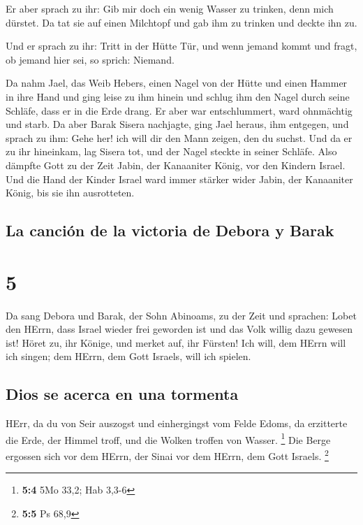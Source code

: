  Er aber sprach zu ihr: Gib mir doch ein wenig Wasser zu
trinken, denn mich dürstet. Da tat sie auf einen Milchtopf und gab ihm
zu trinken und deckte ihn zu.

 Und er sprach zu ihr: Tritt in der Hütte Tür, und wenn
jemand kommt und fragt, ob jemand hier sei, so sprich: Niemand.

 Da nahm Jael, das Weib Hebers, einen Nagel von der Hütte
und einen Hammer in ihre Hand und ging leise zu ihm hinein und schlug
ihm den Nagel durch seine Schläfe, dass er in die Erde drang. Er aber
war entschlummert, ward ohnmächtig und starb.  Da aber
Barak Sisera nachjagte, ging Jael heraus, ihm entgegen, und sprach zu
ihm: Gehe her! ich will dir den Mann zeigen, den du suchst. Und da er zu
ihr hineinkam, lag Sisera tot, und der Nagel steckte in seiner Schläfe.
 Also dämpfte Gott zu der Zeit Jabin, der Kanaaniter
König, vor den Kindern Israel.  Und die Hand der Kinder
Israel ward immer stärker wider Jabin, der Kanaaniter König, bis sie ihn
ausrotteten.

\hypertarget{la-canciuxf3n-de-la-victoria-de-debora-y-barak}{%
\subsection{La canción de la victoria de Debora y
Barak}\label{la-canciuxf3n-de-la-victoria-de-debora-y-barak}}

\hypertarget{section-4}{%
\section{5}\label{section-4}}

 Da sang Debora und Barak, der Sohn Abinoams, zu der Zeit
und sprachen:  Lobet den HErrn, dass Israel wieder frei
geworden ist und das Volk willig dazu gewesen ist!  Höret
zu, ihr Könige, und merket auf, ihr Fürsten! Ich will, dem HErrn will
ich singen; dem HErrn, dem Gott Israels, will ich spielen.

\hypertarget{dios-se-acerca-en-una-tormenta}{%
\subsection{Dios se acerca en una
tormenta}\label{dios-se-acerca-en-una-tormenta}}

 HErr, da du von Seir auszogst und einhergingst vom Felde
Edoms, da erzitterte die Erde, der Himmel troff, und die Wolken troffen
von Wasser. \footnote{\textbf{5:4} 5Mo 33,2; Hab 3,3-6} 
Die Berge ergossen sich vor dem HErrn, der Sinai vor dem HErrn, dem Gott
Israels. \footnote{\textbf{5:5} Ps 68,9}

